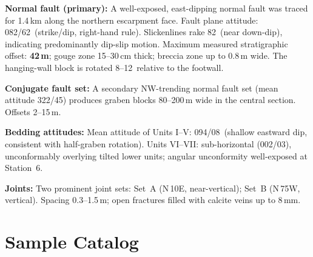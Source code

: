 \documentclass[11pt,a4paper]{article}
\begin{document}
\textbf{Normal fault (primary):}
A well-exposed, east-dipping normal fault was traced for 1.4\,km along the
northern escarpment face.
Fault plane attitude: 082\textdegree/62\textdegree\ (strike/dip, right-hand rule).
Slickenlines rake 82\textdegree\ (near down-dip), indicating predominantly dip-slip motion.
Maximum measured stratigraphic offset: \textbf{42\,m}; gouge zone 15--30\,cm thick;
breccia zone up to 0.8\,m wide.
The hanging-wall block is rotated 8--12\textdegree\ relative to the footwall.

\textbf{Conjugate fault set:}
A secondary NW-trending normal fault set (mean attitude 322\textdegree/45\textdegree) produces
graben blocks 80--200\,m wide in the central section. Offsets 2--15\,m.

\textbf{Bedding attitudes:}
Mean attitude of Units I--V: 094\textdegree/08\textdegree\ (shallow eastward dip, consistent with
half-graben rotation). Units VI--VII: sub-horizontal (002\textdegree/03\textdegree), unconformably
overlying tilted lower units; angular unconformity well-exposed at Station~6.

\textbf{Joints:}
Two prominent joint sets: Set~A (N\,10\textdegree{}E, near-vertical); Set~B (N\,75\textdegree{}W, vertical).
Spacing 0.3--1.5\,m; open fractures filled with calcite veins up to 8\,mm.

\section{Sample Catalog}
\end{document}
